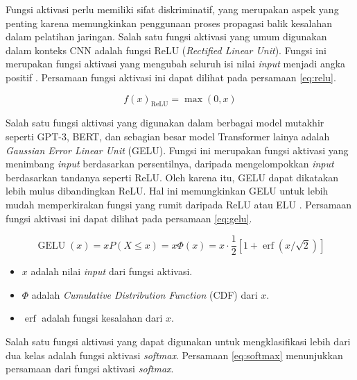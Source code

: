 \par Fungsi aktivasi perlu memiliki sifat diskriminatif, yang merupakan aspek yang penting karena memungkinkan penggunaan proses propagasi balik kesalahan dalam pelatihan jaringan. Salah satu fungsi aktivasi yang umum digunakan dalam konteks CNN adalah fungsi ReLU (\textit{Rectified Linear Unit}). Fungsi ini merupakan fungsi aktivasi yang mengubah seluruh isi nilai \textit{input} menjadi angka positif \citep{alzubaidi2021review}. Persamaan fungsi aktivasi ini dapat dilihat pada persamaan \ref{eq:relu}.

\begin{equation}
    f(x)_\text{ReLU} = \max(0, x)
    \label{eq:relu}
\end{equation}

\par Salah satu fungsi aktivasi yang digunakan dalam berbagai model mutakhir seperti GPT-3, BERT, dan sebagian besar model Transformer lainya adalah \textit{Gaussian Error Linear Unit} (GELU). Fungsi ini merupakan fungsi aktivasi yang menimbang \textit{input} berdasarkan persentilnya, daripada mengelompokkan \textit{input} berdasarkan tandanya seperti ReLU. Oleh karena itu, GELU dapat dikatakan lebih mulus dibandingkan ReLU. Hal ini memungkinkan GELU untuk lebih mudah memperkirakan fungsi yang rumit daripada ReLU atau ELU \citep{hendrycks2016gaussian}. Persamaan fungsi aktivasi ini dapat dilihat pada persamaan \ref{eq:gelu}.

\begin{equation}
    \operatorname{GELU}(x)=x P(X \leq x)=x \Phi(x)=x \cdot \frac{1}{2}[1+\operatorname{erf}(x / \sqrt{2})]
    \label{eq:gelu}
\end{equation}

\begin{itemize}

    \item{$x$ adalah nilai \textit{input} dari fungsi aktivasi.}

    \item{$\Phi$ adalah \textit{Cumulative Distribution Function} (CDF) dari $x$.}

    \item{$\operatorname{erf}$ adalah fungsi kesalahan dari $x$.}


\end{itemize}


\par Salah satu fungsi aktivasi yang dapat digunakan untuk mengklasifikasi lebih dari dua kelas adalah fungsi aktivasi \textit{softmax}. Persamaan \ref{eq:softmax} menunjukkan persamaan dari fungsi aktivasi \textit{softmax}.

